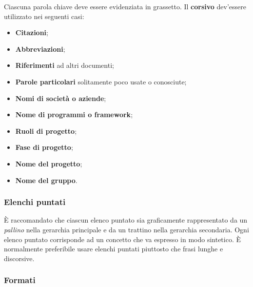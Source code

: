 	Ciascuna parola chiave deve essere evidenziata in grassetto. Il \textbf{corsivo} dev'essere utilizzato nei seguenti casi:
	\begin{itemize}
	
		\item \textbf{Citazioni};
		\item \textbf{Abbreviazioni};
		\item \textbf{Riferimenti} ad altri documenti;
		\item \textbf{Parole particolari} solitamente poco usate o conosciute;
		\item \textbf{Nomi di società o aziende};
		\item \textbf{Nome di programmi o framework};
		\item \textbf{Ruoli di progetto};
		\item \textbf{Fase di progetto};
		\item \textbf{Nome del progetto};
		\item \textbf{Nome del gruppo}.
	\end{itemize}		
	
	\subsubsection{Elenchi puntati}
	
	È raccomandato che ciascun elenco puntato sia graficamente rappresentato da un \textit{pallino} nella gerarchia principale e da un trattino nella gerarchia secondaria. Ogni elenco puntato corrisponde ad un concetto che va espresso in modo sintetico. È normalmente preferibile usare elenchi puntati piuttosto che frasi lunghe e discorsive.
	
	\subsubsection{Formati}
	
